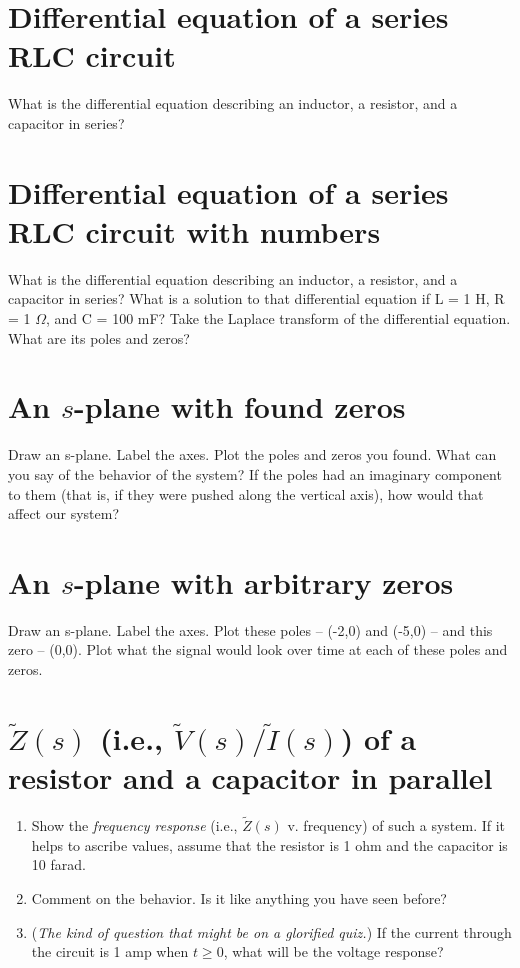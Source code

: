 \documentclass[11pt]{book}
\begin{document}
\section{Differential equation of a series RLC circuit}
What is the differential equation describing an inductor, a resistor, and a capacitor in series?



\section{Differential equation of a series RLC circuit with numbers}
What is the differential equation describing an inductor, a resistor, and a capacitor in series? What is a solution to that  differential equation if L = 1 H, R = 1 $\Omega$, and C = 100 mF? Take the Laplace transform of the differential equation. What are its poles and zeros?



\section{An $s$-plane with found zeros}
Draw an s-plane. Label the axes. Plot the poles and zeros you found. What can you say of the behavior of the system? If the poles had an imaginary component to them (that is, if they were pushed along the vertical axis), how would that affect our system?

\section{An $s$-plane with arbitrary zeros}
Draw an s-plane. Label the axes. Plot these poles -- (-2,0) and (-5,0) -- and this zero -- (0,0). Plot what the signal would look over time at each of these poles and zeros. 

\section{$\tilde{Z}(s)$ (i.e., $\tilde{V}(s)/\tilde{I}(s)$) of a resistor and a capacitor in parallel}
\begin{enumerate}
	\item Show the \textit{frequency response} (i.e., $\tilde{Z}(s)$ v. frequency) of such a system. If it helps to ascribe values, assume that the resistor is 1 ohm and the capacitor is 10 farad.
	\item Comment on the behavior. Is it like anything you have seen before?
	\item (\textit{The kind of question that might be on a glorified quiz.}) If the current through the circuit is 1 amp when $t \geq 0$, what will be the voltage response?
\end{enumerate}
\end{document}
